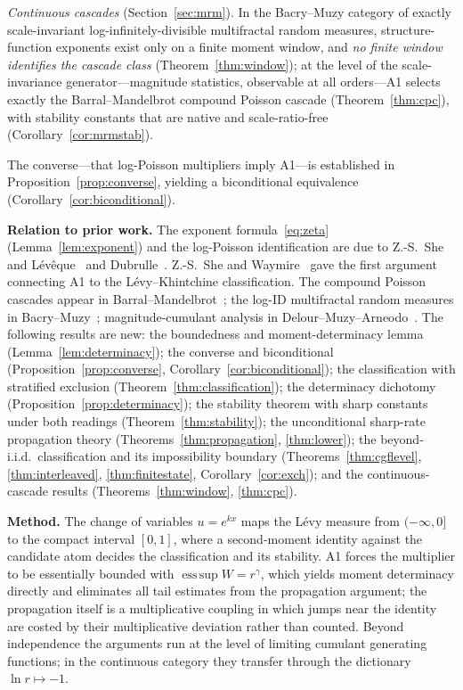 \documentclass[pdflatex,sn-mathphys-num]{sn-jnl}
\theoremstyle{thmstyleone}
\theoremstyle{thmstyletwo}
\theoremstyle{thmstylethree}
\DeclareMathOperator*{\esssup}{ess\,sup}
\begin{document}
\emph{Continuous cascades}
(Section~\ref{sec:mrm}).  In the Bacry--Muzy category of exactly
scale-invariant log-infinitely-divisible multifractal random
measures, structure-function exponents exist only on a finite moment
window, and \emph{no finite window identifies the cascade class}
(Theorem~\ref{thm:window}); at the level of the scale-invariance
generator---magnitude statistics, observable at all orders---A1
selects exactly the Barral--Mandelbrot compound Poisson cascade
(Theorem~\ref{thm:cpc}), with stability constants that are native
and scale-ratio-free (Corollary~\ref{cor:mrmstab}).

The converse---that log-Poisson multipliers imply
A1---is established in Proposition~\ref{prop:converse}, yielding a
biconditional equivalence (Corollary~\ref{cor:biconditional}).

\smallskip
\noindent\textbf{Relation to prior work.}
The exponent formula~\eqref{eq:zeta} (Lemma~\ref{lem:exponent})
and the log-Poisson identification are due to
Z.-S.~She and L\'ev\^eque~\cite{SL94} and Dubrulle~\cite{Dub94}.
Z.-S.~She and Waymire~\cite{SW95} gave the first argument connecting
A1 to the L\'evy--Khintchine classification.  The compound Poisson
cascades appear in Barral--Mandelbrot~\cite{BM02}; the log-ID
multifractal random measures in Bacry--Muzy~\cite{BM03,MB02};
magnitude-cumulant analysis in Delour--Muzy--Arneodo~\cite{DMA01}.
The following results are new: the boundedness and
moment-determinacy lemma (Lemma~\ref{lem:determinacy}); the converse
and biconditional (Proposition~\ref{prop:converse},
Corollary~\ref{cor:biconditional}); the classification with
stratified exclusion (Theorem~\ref{thm:classification}); the
determinacy dichotomy (Proposition~\ref{prop:determinacy}); the
stability theorem with sharp constants under both readings
(Theorem~\ref{thm:stability}); the unconditional sharp-rate
propagation theory (Theorems~\ref{thm:propagation},
\ref{thm:lower}); the beyond-i.i.d.\ classification and its
impossibility boundary (Theorems~\ref{thm:cgflevel},
\ref{thm:interleaved}, \ref{thm:finitestate},
Corollary~\ref{cor:exch}); and the continuous-cascade results
(Theorems~\ref{thm:window}, \ref{thm:cpc}).

\smallskip
\noindent\textbf{Method.}
The change of variables $u = e^{kx}$ maps the L\'evy measure from
$(-\infty,0]$ to the compact interval $[0,1]$, where a second-moment
identity against the candidate atom decides the classification and
its stability.  A1 forces the multiplier to be essentially bounded
with $\esssup W = r^\gamma$, which yields moment determinacy
directly and eliminates all tail estimates from the propagation
argument; the propagation itself is a multiplicative coupling in
which jumps near the identity are costed by their multiplicative
deviation rather than counted.  Beyond independence the arguments
run at the level of limiting cumulant generating functions; in the
continuous category they transfer through the dictionary
$\ln r \mapsto -1$.
\end{document}
